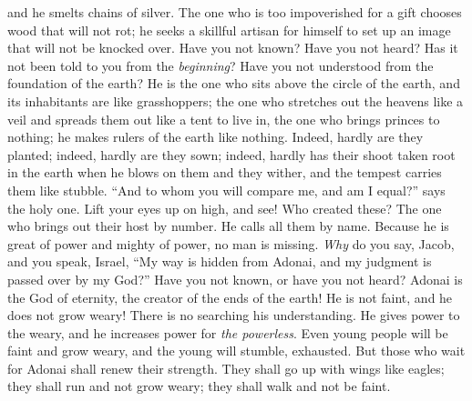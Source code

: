 \begin{biblechapter}
and he smelts chains of silver.
\verse The one who is too impoverished for a gift chooses wood that will not rot; 
he seeks a skillful artisan for himself to set up an image that will not be knocked over.
\verse Have you not known? 
Have you not heard? 
Has it not been told to you from the \textit{beginning}? 
Have you not understood from the foundation of the earth?
\verse He is the one who sits above the circle of the earth, 
and its inhabitants are like grasshoppers; 
the one who stretches out the heavens like a veil 
and spreads them out like a tent to live in,
\verse the one who brings princes to nothing; 
he makes rulers of the earth like nothing.
\verse Indeed, hardly are they planted; indeed, hardly are they sown; 
indeed, hardly has their shoot taken root in the earth 
when he blows on them and they wither, 
and the tempest carries them like stubble.
\verse “And to whom you will compare me, and am I equal?” says the holy one.
\verse Lift your eyes up on high, and see! Who created these? 
The one who brings out their host by number. 
He calls all them by name. 
Because he is great of power 
and mighty of power, no man is missing.
\verse \textit{Why} do you say, Jacob, 
and you speak, Israel, 
“My way is hidden from Adonai, 
and my judgment is passed over by my God?”
\verse Have you not known, 
or have you not heard? 
Adonai is the God of eternity, 
the creator of the ends of the earth! 
He is not faint, and he does not grow weary! 
There is no searching his understanding.
\verse He gives power to the weary, 
and he increases power for \textit{the powerless}.
\verse Even young people will be faint and grow weary, 
and the young will stumble, exhausted.
\verse But those who wait for Adonai shall renew their strength. 
They shall go up with wings like eagles; 
they shall run and not grow weary; 
they shall walk and not be faint.
\end{biblechapter}

